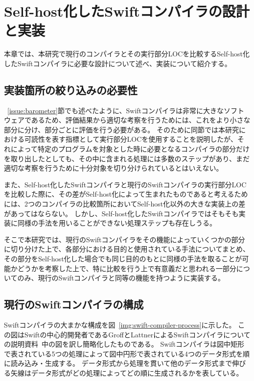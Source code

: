 \chapter{Self-host化したSwiftコンパイラの設計と実装}
\label{implementation}

本章では、本研究で現行のコンパイラとその実行部分LOCを比較するSelf-host化したSwiftコンパイラに必要な設計について述べ、実装について紹介する。

\section{実装箇所の絞り込みの必要性}
\label{implementation:refinement}

~\ref{issue:barometer}節でも述べたように、Swiftコンパイラは非常に大きなソフトウェアであるため、評価結果から適切な考察を行うためには、これをより小さな部分に分け、部分ごとに評価を行う必要がある。
そのために同節では本研究における可読性を表す指標として実行部分LOCを使用することを説明したが、それによって特定のプログラムを対象とした時に必要となるコンパイラの部分だけを取り出したとしても、その中に含まれる処理には多数のステップがあり、まだ適切な考察を行うために十分対象を切り分けられているとはいえない。

また、Self-host化したSwiftコンパイラと現行のSwiftコンパイラの実行部分LOCを比較した際に、その差がSelf-host化によって生まれたものであると考えるためには、2つのコンパイラの比較箇所においてSelf-host化以外の大きな実装上の差があってはならない。
しかし、Self-host化したSwiftコンパイラではそもそも実装に同様の手法を用いることができない処理ステップも存在しうる。

そこで本研究では、現行のSwiftコンパイラをその機能によっていくつかの部分に切り分けた上で、各部分における目的と使用されている手法についてまとめ、その部分をSelf-host化した場合でも同じ目的のもとに同様の手法を取ることが可能かどうかを考察した上で、特に比較を行う上で有意義だと思われる一部分についてのみ、現行のSwiftコンパイラと同等の機能を持つように実装する。

\section{現行のSwiftコンパイラの構成}
\label{refinement:structure}

Swiftコンパイラの大まかな構成を図~\ref{img:swift-compiler-process}に示した。
この図はSwiftの中心的開発者であるGroffとLattnerによるSwiftコンパイラについての説明資料~\cite{sil}中の図を訳し簡略化したものである。
Swiftコンパイラは図中矩形で表されている5つの処理によって図中円形で表されている4つのデータ形式を順に読み込み・生成する。
データ形式から処理を貫いて他のデータ形式まで伸びる矢線はデータ形式がどの処理によってどの順に生成されるかを表している。

